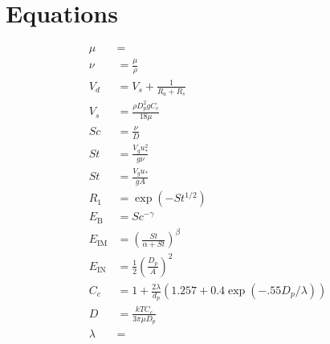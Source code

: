 \documentclass{article}
\begin{document}

\section{Equations}
\label{sec:equations}

\begin{align}
\mu & =  \label{eq:dynamic_visc}\\
\nu & = \frac{\mu}{\rho}  \label{eq:kinematic_visc}\\
V_d &= V_s + \frac{1}{R_a + R_s} \label{eq:vd}\\
V_s & = \frac{\rho D_p^2gC_c}{18\mu } \label{eq:vs}\\
Sc &= \frac{\nu}{D}   \label{eq:sc} \\
St &= \frac{V_gu_*^2}{g \nu } \label{eq:st_smooth}\\
St &= \frac{V_gu_*}{gA}  \label{eq:st_veg}\\
R_1 &= \exp(-St^{1/2}) \label{eq:R_1}\\
E_{\textrm{B}} &= Sc^{-\gamma}  \label{eq:eb}\\
E_{\textrm{IM}} & = \left(\frac{St}{\alpha + St}\right)^{\beta} \label{eq:eim}\\
E_{\textrm{IN}} &= \frac{1}{2} \left(\frac{D_p}{A}\right)^2 \label{eq:ein}\\
C_c & = 1 + \frac{2 \lambda}{d_p}\left(1.257 + 0.4\exp(-.55 D_p/\lambda)\right)  \label{eq:cc}\\ 
D & = \frac{kTC_c}{3 \pi \mu D_p}  \label{eq:brownian}\\
\lambda & = 
\end{align}
\end{document}
